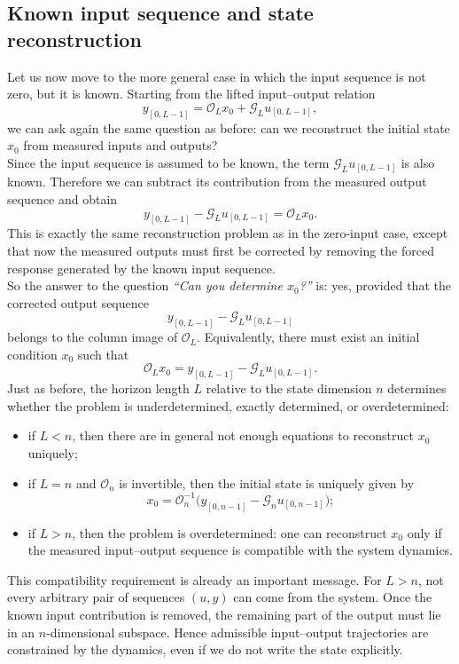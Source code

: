 \subsection{Known input sequence and state reconstruction}

Let us now move to the more general case in which the input sequence is not zero, but it is known. Starting from the lifted input--output relation
\[
y_{[0,L-1]} = \mathcal{O}_L x_0 + \mathcal{G}_L u_{[0,L-1]},
\]
we can ask again the same question as before: can we reconstruct the initial state $x_0$ from measured inputs and outputs?\\
Since the input sequence is assumed to be known, the term $\mathcal{G}_L u_{[0,L-1]}$ is also known. Therefore we can subtract its contribution from the measured output sequence and obtain
\[
y_{[0,L-1]} - \mathcal{G}_L u_{[0,L-1]} = \mathcal{O}_L x_0.
\]
This is exactly the same reconstruction problem as in the zero-input case, except that now the measured outputs must first be corrected by removing the forced response generated by the known input sequence.\\

So the answer to the question \emph{``Can you determine $x_0$?''} is: yes, provided that the corrected output sequence
\[
y_{[0,L-1]} - \mathcal{G}_L u_{[0,L-1]}
\]
belongs to the column image of $\mathcal{O}_L$. Equivalently, there must exist an initial condition $x_0$ such that
\[
\mathcal{O}_L x_0 = y_{[0,L-1]} - \mathcal{G}_L u_{[0,L-1]}.
\]
Just as before, the horizon length $L$ relative to the state dimension $n$ determines whether the problem is underdetermined, exactly determined, or overdetermined:
\begin{itemize}
    \item if $L<n$, then there are in general not enough equations to reconstruct $x_0$ uniquely;
    \item if $L=n$ and $\mathcal{O}_n$ is invertible, then the initial state is uniquely given by
    \[
    x_0 = \mathcal{O}_n^{-1}\bigl(y_{[0,n-1]} - \mathcal{G}_n u_{[0,n-1]}\bigr);
    \]
    \item if $L>n$, then the problem is overdetermined: one can reconstruct $x_0$ only if the measured input--output sequence is compatible with the system dynamics.
\end{itemize}
This compatibility requirement is already an important message. For $L>n$, not every arbitrary pair of sequences $(u,y)$ can come from the system. Once the known input contribution is removed, the remaining part of the output must lie in an $n$-dimensional subspace. Hence admissible input--output trajectories are constrained by the dynamics, even if we do not write the state explicitly.

